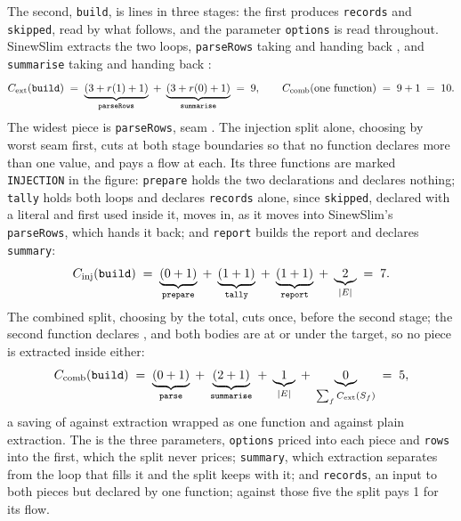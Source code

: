 \documentclass[11pt,a4paper]{article}
\newcommand{\sig}[1]{\texttt{#1}}
\begin{document}
The second, \sig{build}, is \exbLines{} lines in three stages: the first
produces \sig{records} and \sig{skipped}, read by what follows, and the
parameter \sig{options} is read throughout. SinewSlim extracts the two loops,
\sig{parseRows} taking \exbPieceOneInputs{} and handing back
\exbPieceOneOutputs{}, and \sig{summarise} taking \exbPieceTwoInputs{} and
handing back \exbPieceTwoOutputs{}:
\begin{equation*}
  C_{\mathrm{ext}}(\sig{build}) \;=\;
    \underbrace{(\exbPieceOneInputsN{} + r(\exbPieceOneOutputsN{}) + 1)}_{\sig{parseRows}} \;+\;
    \underbrace{(\exbPieceTwoInputsN{} + r(\exbPieceTwoOutputsN{}) + 1)}_{\sig{summarise}} \;=\; \exbSinewCost{},
  \qquad
  C_{\mathrm{comb}}(\text{one function}) \;=\; \exbSinewCost{} + 1 \;=\; \exbSinewCostPlusOne{}.
\end{equation*}
The widest piece is \sig{parseRows}, seam \exbSinewWidth{}. The injection
split alone, choosing by worst seam first, cuts at both stage boundaries so
that no function declares more than one value, and pays a flow at each. Its
three functions are marked \sig{INJECTION} in the figure: \sig{prepare}
holds the two declarations and declares nothing; \sig{tally} holds both
loops and declares \sig{records} alone, since \sig{skipped}, declared with a
literal and first used inside it, moves in, as it moves into SinewSlim's
\sig{parseRows}, which hands it back; and \sig{report} builds the report
and declares \sig{summary}:
\begin{equation*}
  C_{\mathrm{inj}}(\sig{build}) \;=\;
    \underbrace{(\exbInjFunOneDeclares{} + 1)}_{\sig{prepare}} \;+\;
    \underbrace{(\exbInjFunTwoDeclares{} + 1)}_{\sig{tally}} \;+\;
    \underbrace{(\exbInjFunThreeDeclares{} + 1)}_{\sig{report}}
    \;+\; \underbrace{\exbInjEdges{}}_{|E|} \;=\; \exbInjTotal{}.
\end{equation*}
The combined split, choosing by the total, cuts once, before the second
stage; the second function declares \exbCombDeclares{}, and both bodies are
at or under the target, so no piece is extracted inside either:
\begin{equation*}
  C_{\mathrm{comb}}(\sig{build}) \;=\;
    \underbrace{(\exbCombFunOneDeclares{} + 1)}_{\sig{parse}} \;+\;
    \underbrace{(\exbCombFunTwoDeclares{} + 1)}_{\sig{summarise}} \;+\;
    \underbrace{\exbCombEdges{}}_{|E|} \;+\;
    \underbrace{0}_{\sum_f C_{\mathrm{ext}}(S_f)} \;=\; \exbCombSum{},
\end{equation*}
a saving of \exbSavingWrapped{} against extraction wrapped as one function
and \exbSavingPlain{} against plain extraction. The \exbSavingPlain{} is
the three parameters, \sig{options} priced into each piece and \sig{rows}
into the first, which the split never prices; \sig{summary}, which
extraction separates from the loop that fills it and the split keeps with
it; and \sig{records}, an input to both pieces but declared by one
function; against those five the split pays 1 for its flow.
\end{document}
